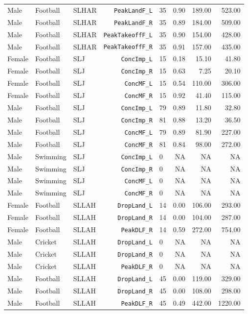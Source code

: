 {\begin{longtable}{lllrlrrr}
Male & Football & SLHAR & \texttt{PeakLandF\_L} & 35 & 0.90 & 189.00 & 523.00 \\
Male & Football & SLHAR & \texttt{PeakLandF\_R} & 35 & 0.89 & 184.00 & 509.00 \\
Male & Football & SLHAR & \texttt{PeakTakeoffF\_L} & 35 & 0.90 & 154.00 & 428.00 \\
Male & Football & SLHAR & \texttt{PeakTakeoffF\_R} & 35 & 0.91 & 157.00 & 435.00 \\
\addlinespace[1pt]
Female & Football & SLJ & \texttt{ConcImp\_L} & 15 & 0.18 & 15.10 & 41.80 \\
Female & Football & SLJ & \texttt{ConcImp\_R} & 15 & 0.63 & 7.25 & 20.10 \\
Female & Football & SLJ & \texttt{ConcMF\_L} & 15 & 0.54 & 110.00 & 306.00 \\
Female & Football & SLJ & \texttt{ConcMF\_R} & 15 & 0.92 & 41.40 & 115.00 \\
Male & Football & SLJ & \texttt{ConcImp\_L} & 79 & 0.89 & 11.80 & 32.80 \\
Male & Football & SLJ & \texttt{ConcImp\_R} & 81 & 0.88 & 13.20 & 36.50 \\
Male & Football & SLJ & \texttt{ConcMF\_L} & 79 & 0.89 & 81.90 & 227.00 \\
Male & Football & SLJ & \texttt{ConcMF\_R} & 81 & 0.84 & 98.00 & 272.00 \\
Male & Swimming & SLJ & \texttt{ConcImp\_L} & 0 & NA & NA & NA \\
Male & Swimming & SLJ & \texttt{ConcImp\_R} & 0 & NA & NA & NA \\
Male & Swimming & SLJ & \texttt{ConcMF\_L} & 0 & NA & NA & NA \\
Male & Swimming & SLJ & \texttt{ConcMF\_R} & 0 & NA & NA & NA \\
\addlinespace[1pt]
Female & Football & SLLAH & \texttt{DropLand\_L} & 14 & 0.00 & 106.00 & 293.00 \\
Female & Football & SLLAH & \texttt{DropLand\_R} & 14 & 0.00 & 104.00 & 287.00 \\
Female & Football & SLLAH & \texttt{PeakDLF\_R} & 14 & 0.59 & 272.00 & 754.00 \\
Male & Cricket & SLLAH & \texttt{DropLand\_L} & 0 & NA & NA & NA \\
Male & Cricket & SLLAH & \texttt{DropLand\_R} & 0 & NA & NA & NA \\
Male & Cricket & SLLAH & \texttt{PeakDLF\_R} & 0 & NA & NA & NA \\
Male & Football & SLLAH & \texttt{DropLand\_L} & 45 & 0.00 & 119.00 & 329.00 \\
Male & Football & SLLAH & \texttt{DropLand\_R} & 45 & 0.00 & 108.00 & 298.00 \\
Male & Football & SLLAH & \texttt{PeakDLF\_R} & 45 & 0.49 & 442.00 & 1220.00 \\
\end{longtable}
}
